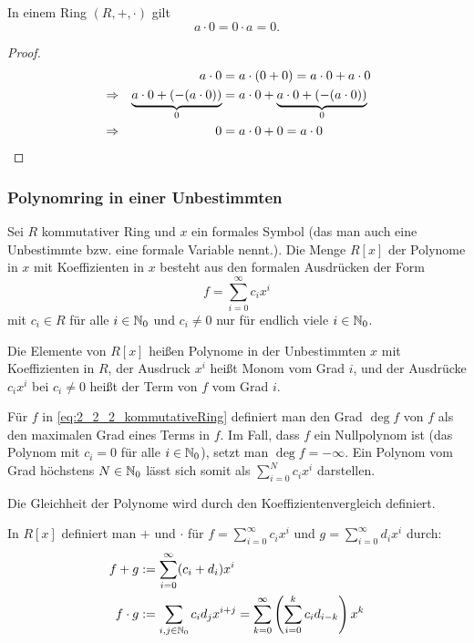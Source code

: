\begin{bem}
	In einem Ring $ (R,+,\cdot) $ gilt
	\begin{equation}
		a \cdot 0 = 0 \cdot a = 0.
	\end{equation}
\end{bem}
\begin{proof}
	\begin{align*}
		&&a \cdot 0 &= a \cdot (0+0) = a \cdot 0+ a \cdot 0 \\
		&\Rightarrow &\underbrace{a \cdot 0 + (-(a \cdot 0))}_{0} &= a \cdot 0 + \underbrace{a \cdot 0+(-(a \cdot 0))}_{0}\\
		&\Rightarrow & 0 &= a \cdot 0 + 0 = a \cdot 0 \qedhere
	\end{align*}
\end{proof}

\subsubsection{Polynomring in einer Unbestimmten}


Sei $ R $ kommutativer Ring und $ x $ ein formales Symbol (das man auch eine Unbestimmte bzw. eine formale Variable nennt.). Die Menge $R[x]$ der Polynome in $x$ mit Koeffizienten in $x$ besteht aus den formalen Ausdrücken der Form
\begin{equation}
	f = \sum_{i=0}^{\infty} c_{i}x^{i} \label{eq:2_2_2_kommutativeRing}
\end{equation}
 mit $ c_{i} \in R $ für alle $i \in \mathbb N_0$ und $c_i \ne 0$ nur für endlich viele $i \in \mathbb N_0$. 

Die Elemente von $ R[x] $ heißen Polynome in der Unbestimmten $ x $ mit Koeffizienten in $ R $, der Ausdruck $x^i$ heißt Monom vom Grad $i$, und der Ausdrücke $ c_ix^i $ bei $c_i \ne 0$ heißt der Term von $f$ vom Grad $i$. 


Für $ f $ in \eqref{eq:2_2_2_kommutativeRing} definiert man den Grad $\deg f$ von $ f $ als den maximalen Grad eines Terms in $f$. Im Fall, dass $f$ ein Nullpolynom ist (das Polynom mit $c_i =0$ für alle $i \in \mathbb N_0$), setzt man $\deg f = -\infty$. Ein Polynom vom Grad höchstens $N \in \mathbb N_0$ lässt sich somit als $\sum_{i=0}^N c_i x^i$ darstellen. 

Die Gleichheit der Polynome wird durch den Koeffizientenvergleich definiert. 

In $ R[x] $ definiert man $ + $ und $ \cdot $ für $ f = \sum_{i=0}^{\infty} c_{i}x^{i} $ und $ g = \sum_{i=0}^{\infty} d_{i}x^{i} $ durch:
\begin{align}
	f+g &:= \sum_{i=0}^{\infty} (c_{i}+d_{i})x^{i} \\
	f \cdot g &:= \sum_{i,j \in \mathbb N_0} c_i d_j x^{i+j} = \sum_{k=0}^\infty \left( \sum_{i=0}^k c_i d_{i-k} \right) x^k
\end{align}

